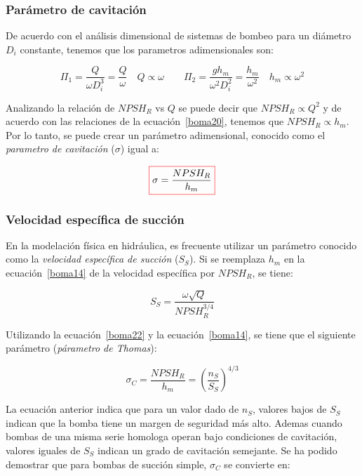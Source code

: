 \documentclass[11pt, oneside]{article}
\begin{document}
\subsubsection*{Par\'ametro de cavitaci\'on}
De acuerdo con el an\'alisis dimensional de sistemas de bombeo para un di\'ametro $D_i$ constante, tenemos que los parametros adimensionales son:

\begin{equation}
\Pi_1 = \frac{Q}{\omega D_i^3} = \frac{Q}{\omega} \quad Q \propto \omega  \quad \quad \Pi_2 = \frac{g h_m}{\omega^2 D_i^2} = \frac{h_m}{\omega^2} \quad h_m \propto \omega^2
\label{boma20}
\end{equation}

Analizando la relaci\'on de $NPSH_R$ vs $Q$ se puede decir que $NPSH_R \propto Q^2$ y de acuerdo con las relaciones de la ecuaci\'on~\ref{boma20}, tenemos que $NPSH_R \propto h_m$. Por lo tanto, se puede crear un par\'ametro adimensional, conocido como el \emph{parametro de cavitaci\'on} ($\sigma$) igual a:

\begin{equation}
\color{red}\boxed{\color{black} \sigma = \frac{NPSH_R}{h_m} }
\label{boma21}
\end{equation}


\subsubsection*{Velocidad espec\'ifica de succi\'on}
En la modelaci\'on f\'isica en hidr\'aulica, es frecuente utilizar un par\'ametro conocido como la \emph{velocidad espec\'ifica de succi\'on} ($S_S$). Si se reemplaza $h_m$ en la ecuaci\'on~\ref{boma14} de la velocidad espec\'ifica por $NPSH_R$, se tiene:

\begin{equation}
S_S = \frac{\omega \sqrt{Q}}{NPSH_R^{3/4}}
\label{boma22}
\end{equation}

Utilizando la ecuaci\'on~\ref{boma22} y la ecuaci\'on~\ref{boma14}, se tiene que el siguiente par\'ametro (\emph{p\'arametro de Thomas}):

\begin{equation}
\sigma_C = \frac{NPSH_R}{h_m} = \left(\frac{n_S}{S_S} \right)^{4/3}
\label{boma23}
\end{equation}

La ecuaci\'on anterior indica que para un valor dado de $n_S$, valores bajos de $S_S$ indican que la bomba tiene un margen de seguridad m\'as alto. Ademas cuando bombas de una misma serie homologa operan bajo condiciones de cavitaci\'on, valores iguales de $S_S$ indican un grado de cavitaci\'on  semejante. Se ha podido demostrar que para bombas de succi\'on simple, $\sigma_C$ se convierte en:
\end{document}
